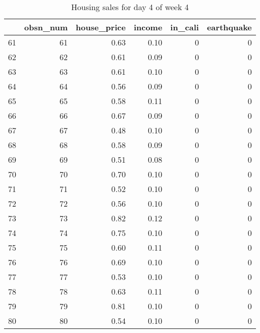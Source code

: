 \begin{table}[ht]
\centering
\begin{tabular}{rrrrrr}
  \hline
 & obsn\_num & house\_price & income & in\_cali & earthquake \\ 
  \hline
61 &  61 & 0.63 & 0.10 &   0 &   0 \\ 
  62 &  62 & 0.61 & 0.09 &   0 &   0 \\ 
  63 &  63 & 0.61 & 0.10 &   0 &   0 \\ 
  64 &  64 & 0.56 & 0.09 &   0 &   0 \\ 
  65 &  65 & 0.58 & 0.11 &   0 &   0 \\ 
  66 &  66 & 0.67 & 0.09 &   0 &   0 \\ 
  67 &  67 & 0.48 & 0.10 &   0 &   0 \\ 
  68 &  68 & 0.58 & 0.09 &   0 &   0 \\ 
  69 &  69 & 0.51 & 0.08 &   0 &   0 \\ 
  70 &  70 & 0.70 & 0.10 &   0 &   0 \\ 
  71 &  71 & 0.52 & 0.10 &   0 &   0 \\ 
  72 &  72 & 0.56 & 0.10 &   0 &   0 \\ 
  73 &  73 & 0.82 & 0.12 &   0 &   0 \\ 
  74 &  74 & 0.75 & 0.10 &   0 &   0 \\ 
  75 &  75 & 0.60 & 0.11 &   0 &   0 \\ 
  76 &  76 & 0.69 & 0.10 &   0 &   0 \\ 
  77 &  77 & 0.53 & 0.10 &   0 &   0 \\ 
  78 &  78 & 0.63 & 0.11 &   0 &   0 \\ 
  79 &  79 & 0.81 & 0.10 &   0 &   0 \\ 
  80 &  80 & 0.54 & 0.10 &   0 &   0 \\ 
   \hline
\end{tabular}
\caption{Housing sales for day 4 of week 4} 
\end{table}
